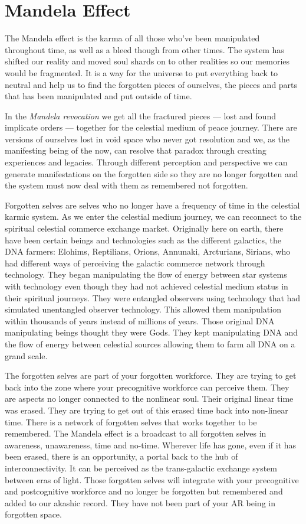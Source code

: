 \documentclass[letterpaper,9pt,twoside,titlepage,onecolumn,openany]{book}
\begin{document}
\section*{Mandela Effect}\label{mandela-effect}

The Mandela effect is the karma of all those who've been manipulated
throughout time, as well as a bleed though from other times. The system
has shifted our reality and moved soul shards on to other realities so
our memories would be fragmented. It is a way for the universe to put
everything back to neutral and help us to find the forgotten pieces of
ourselves, the pieces and parts that has been manipulated and put
outside of time.

In the \emph{Mandela revocation} we get all the fractured pieces ---
lost and found implicate orders --- together for the celestial medium of
peace journey. There are versions of ourselves lost in void space who
never got resolution and we, as the manifesting being of the now, can
resolve that paradox through creating experiences and legacies. Through
different perception and perspective we can generate manifestations on
the forgotten side so they are no longer forgotten and the system must
now deal with them as remembered not forgotten.

Forgotten selves are selves who no longer have a frequency of time in
the celestial karmic system. As we enter the celestial medium journey,
we can reconnect to the spiritual celestial commerce exchange market.
Originally here on earth, there have been certain beings and
technologies such as the different galactics, the DNA farmers: Elohims,
Reptilians, Orions, Annunaki, Arcturians, Sirians, who had different
ways of perceiving the galactic commerce network through technology.
They began manipulating the flow of energy between star systems with
technology even though they had not achieved celestial medium status in
their spiritual journeys. They were entangled observers using technology
that had simulated unentangled observer technology. This allowed them
manipulation within thousands of years instead of millions of years.
Those original DNA manipulating beings thought they were Gods. They kept
manipulating DNA and the flow of energy between celestial sources
allowing them to farm all DNA on a grand scale.

The forgotten selves are part of your forgotten workforce. They are
trying to get back into the zone where your precognitive workforce can
perceive them. They are aspects no longer connected to the nonlinear
soul. Their original linear time was erased. They are trying to get out
of this erased time back into non-linear time. There is a network of
forgotten selves that works together to be remembered. The Mandela
effect is a broadcast to all forgotten selves in awareness, unawareness,
time and no-time. Wherever life has gone, even if it has been erased,
there is an opportunity, a portal back to the hub of interconnectivity.
It can be perceived as the trans-galactic exchange system between eras
of light. Those forgotten selves will integrate with your precognitive
and postcognitive workforce and no longer be forgotten but remembered
and added to our akashic record. They have not been part of your AR
being in forgotten space.
\end{document}
